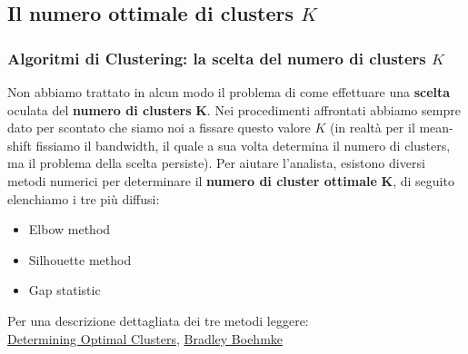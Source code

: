 \subsection[Il numero ottimale di clusters $K$]{Il numero ottimale di clusters $K$}
\begin{frame}
	
	\frametitle{Algoritmi di Clustering: la scelta del numero di clusters $K$}
	
		Non abbiamo trattato in alcun modo il problema di come effettuare una \textbf{scelta} oculata del \textbf{numero di clusters} $\pmb{K}$. Nei procedimenti affrontati abbiamo sempre dato per scontato che siamo noi a fissare questo valore $K$ (in realtà per il mean-shift fissiamo il bandwidth, il quale a sua volta determina il numero di clusters, ma il problema della scelta persiste).
		\newlinedouble
		Per aiutare l'analista, esistono diversi metodi numerici per determinare il \textbf{numero di cluster ottimale} $\pmb{K}$, di seguito elenchiamo i tre più diffusi:
		\begin{itemize}
			\item Elbow method
			\item Silhouette method
			\item Gap statistic
		\end{itemize}
		
		Per una descrizione dettagliata dei tre metodi leggere:\\
		\underline{\href{https://uc-r.github.io/kmeans_clustering\#optimal}{Determining Optimal Clusters}},	\href{https://scholar.google.com/citations?user=Fz5g0gcAAAAJ}{Bradley Boehmke}
	
\end{frame}
